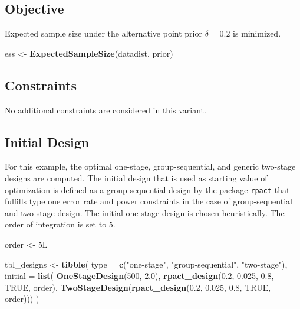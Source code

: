 \documentclass[]{book}
\newenvironment{Shaded}{\begin{snugshade}}{\end{snugshade}}
\newcommand{\DataTypeTok}[1]{\textcolor[rgb]{0.13,0.29,0.53}{#1}}
\newcommand{\DecValTok}[1]{\textcolor[rgb]{0.00,0.00,0.81}{#1}}
\newcommand{\FloatTok}[1]{\textcolor[rgb]{0.00,0.00,0.81}{#1}}
\newcommand{\KeywordTok}[1]{\textcolor[rgb]{0.13,0.29,0.53}{\textbf{#1}}}
\newcommand{\NormalTok}[1]{#1}
\newcommand{\OtherTok}[1]{\textcolor[rgb]{0.56,0.35,0.01}{#1}}
\newcommand{\StringTok}[1]{\textcolor[rgb]{0.31,0.60,0.02}{#1}}
\begin{document}
\hypertarget{objective-7}{%
\subsection{Objective}\label{objective-7}}

Expected sample size under the alternative point prior \(\delta = 0.2\)
is minimized.

\begin{Shaded}
\begin{Highlighting}[]
\NormalTok{ess <-}\StringTok{ }\KeywordTok{ExpectedSampleSize}\NormalTok{(datadist, prior)}
\end{Highlighting}
\end{Shaded}

\hypertarget{constraints-7}{%
\subsection{Constraints}\label{constraints-7}}

No additional constraints are considered in this variant.

\hypertarget{initial-design-5}{%
\subsection{Initial Design}\label{initial-design-5}}

For this example, the optimal one-stage, group-sequential, and generic
two-stage designs are computed.
The initial design that is used as starting value of optimization is defined
as a group-sequential design by the package \texttt{rpact} that fulfills
type one error rate and power constraints in the case of group-sequential and
two-stage design.
The initial one-stage design is chosen heuristically.
The order of integration is set to \(5\).

\begin{Shaded}
\begin{Highlighting}[]
\NormalTok{order <-}\StringTok{ }\NormalTok{5L }

\NormalTok{tbl_designs <-}\StringTok{ }\KeywordTok{tibble}\NormalTok{(}
    \DataTypeTok{type    =} \KeywordTok{c}\NormalTok{(}\StringTok{"one-stage"}\NormalTok{, }\StringTok{"group-sequential"}\NormalTok{, }\StringTok{"two-stage"}\NormalTok{),}
    \DataTypeTok{initial =} \KeywordTok{list}\NormalTok{(}
        \KeywordTok{OneStageDesign}\NormalTok{(}\DecValTok{500}\NormalTok{, }\FloatTok{2.0}\NormalTok{),}
        \KeywordTok{rpact_design}\NormalTok{(}\FloatTok{0.2}\NormalTok{, }\FloatTok{0.025}\NormalTok{, }\FloatTok{0.8}\NormalTok{, }\OtherTok{TRUE}\NormalTok{, order),}
        \KeywordTok{TwoStageDesign}\NormalTok{(}\KeywordTok{rpact_design}\NormalTok{(}\FloatTok{0.2}\NormalTok{, }\FloatTok{0.025}\NormalTok{, }\FloatTok{0.8}\NormalTok{, }\OtherTok{TRUE}\NormalTok{, order))) )}
\end{Highlighting}
\end{Shaded}
\end{document}
